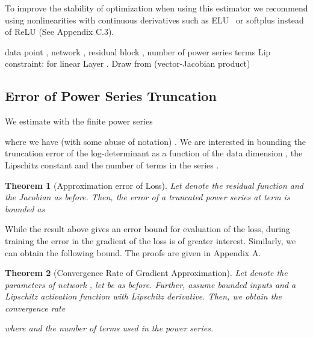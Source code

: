 \documentclass{article}
\newtheorem{theorem}{Theorem}
\begin{document}
To improve the stability of optimization when using this estimator we recommend using nonlinearities with continuous derivatives such as ELU~\citep{DBLP:journals/corr/ClevertUH15} or softplus instead of ReLU (See Appendix C.3).

\begin{algorithm}[tb]
   \caption{Forward pass of an invertible ResNets with Lipschitz constraint and log-determinant approximation, SN denotes spectral normalization based on \eqref{eq:spectralNorm}.}
   \label{alg:algoOverview}
\begin{algorithmic}
    data point , network , residual block , number of power series terms 
   \STATE Lip constraint:  for linear Layer .
   \STATE Draw  from 
   \STATE  
   \STATE 
   \STATE  (vector-Jacobian product)
   \STATE 
   \ENDFOR
   \ENDFOR
\end{algorithmic}
\end{algorithm}

\subsection{Error of Power Series Truncation}
\label{sec:bound}
We estimate  with the finite power series

where we have (with some abuse of notation) . 
We are interested in bounding the truncation error of the log-determinant as a function of the data dimension , the Lipschitz constant  and the number of terms in the series . 
\begin{theorem}[Approximation error of Loss]
\label{thm:biasLoss}
Let  denote the residual function and  the Jacobian as before. Then, the error of a truncated power series at term  is bounded as

\end{theorem}
While the result above gives an error bound for evaluation of the loss, during training the error in the gradient of the loss is of greater interest. Similarly, we can obtain the following bound. The proofs are given in Appendix A.

\iffalse
\begin{theorem}[Approximation Error of Gradient]
\label{thm:biasGrad}
Let  denote the parameters of network ,  the input dimension and let  be as before. Assume that the inputs are bounded as . Then, we obtain the bound

where  is a bounded constant depending on the implementation of residual layer  and the bound .
\end{theorem}
\fi
\begin{theorem}[Convergence Rate of Gradient Approximation]
\label{thm:biasGrad}
Let  denote the parameters of network , let  be as before. Further, assume bounded inputs and a Lipschitz activation function with Lipschitz derivative. Then, we obtain the convergence rate

where  and  the number of terms used in the power series.
\end{theorem}
\end{document}
